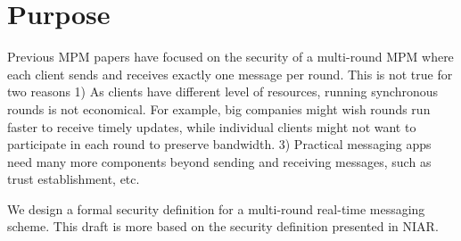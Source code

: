 \section{Purpose}
Previous MPM papers have focused on the security of a multi-round MPM where each client sends and receives exactly one message per round. This is not true for two reasons 1) As clients have different level of resources, running synchronous rounds is not economical. For example, big companies might wish rounds run faster to receive timely updates, while individual clients might not want to participate in each round to preserve bandwidth. 3) Practical messaging apps need many more components beyond sending and receiving messages, such as trust establishment, etc. 


We design a formal security definition for a multi-round real-time messaging scheme. This draft is more based on the security definition presented in NIAR. 



